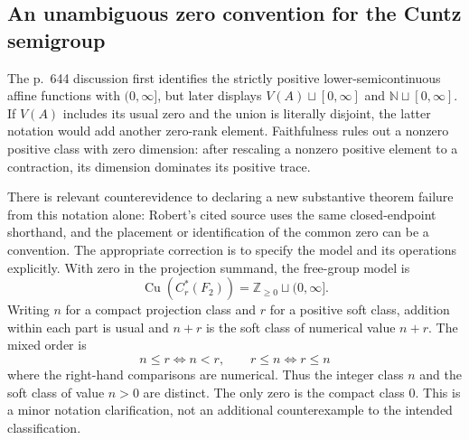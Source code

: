 \documentclass[10pt]{article}
\begin{document}
\subsection*{An unambiguous zero convention for the Cuntz semigroup}
The p. 644 discussion first identifies the strictly positive lower-semicontinuous affine functions with \((0,\infty]\), but later displays \(V(A)\sqcup[0,\infty]\) and \(\mathbb N\sqcup[0,\infty]\). If \(V(A)\) includes its usual zero and the union is literally disjoint, the latter notation would add another zero-rank element. Faithfulness rules out a nonzero positive class with zero dimension: after rescaling a nonzero positive element to a contraction, its dimension dominates its positive trace.\par
There is relevant counterevidence to declaring a new substantive theorem failure from this notation alone: Robert’s cited source uses the same closed-endpoint shorthand, and the placement or identification of the common zero can be a convention. The appropriate correction is to specify the model and its operations explicitly. With zero in the projection summand, the free-group model is \[\operatorname{Cu}(C_r^*(F_2))=\mathbb Z_{\ge0}\sqcup(0,\infty].\] Writing \(n\) for a compact projection class and \(r\) for a positive soft class, addition within each part is usual and \(n+r\) is the soft class of numerical value \(n+r\). The mixed order is \[n\le r \iff n<r,\qquad
      r\le n \iff r\le n\] where the right-hand comparisons are numerical. Thus the integer class \(n\) and the soft class of value \(n>0\) are distinct. The only zero is the compact class \(0\). This is a minor notation clarification, not an additional counterexample to the intended classification.\par
\end{document}
